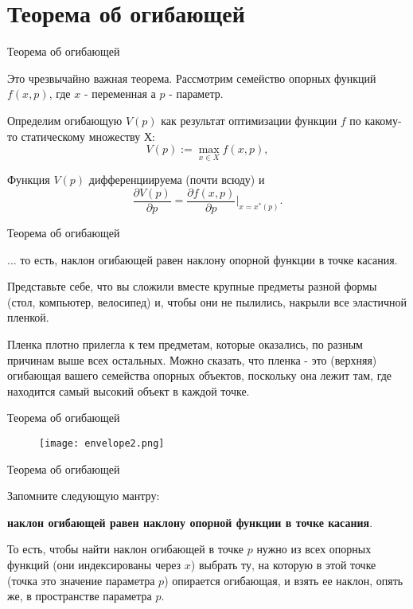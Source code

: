 \documentclass{beamer}
\begin{document}
\section{Теорема об огибающей}

\begin{frame}{Теорема об огибающей}

Это чрезвычайно важная теорема. Рассмотрим семейство опорных функций $f(x, p)$, где $x$ - переменная а $p$ - параметр. 

Определим огибающую $V(p)$ как результат оптимизации функции $f$ по какому-то статическому множеству $Х$: 
$$ V(p) := \max_{x \in X} f(x, p),$$

\begin{theorem}[Об огибающей]
Функция $V(p)$ дифференциируема (почти всюду) и 
$$\frac{\partial V(p)}{\partial p} = \frac{\partial f(x, p)}{\partial p}|_{x = x^{\ast}(p)}.$$
\end{theorem}

\end{frame}

\begin{frame}{Теорема об огибающей}

... то есть, наклон огибающей равен наклону опорной функции в точке касания.

Представьте себе, что вы сложили вместе крупные предметы разной формы (стол, компьютер, велосипед) и, чтобы они не пылились, накрыли все эластичной пленкой. 

Пленка плотно прилегла к тем предметам, которые оказались, по разным причинам выше всех остальных. Можно сказать, что пленка - это (верхняя) огибающая вашего семейства опорных объектов, поскольку она лежит там, где находится самый высокий объект в каждой точке.

\end{frame}

\begin{frame}{Теорема об огибающей}

\begin{figure}[hbt]
\centering
\texttt{[image: envelope2.png]}
\end{figure}

\end{frame}

\begin{frame}{Теорема об огибающей}

Запомните следующую мантру: 

\textbf{наклон огибающей равен наклону опорной функции в точке касания}. 

То есть, чтобы найти наклон огибающей в точке $p$ нужно из всех опорных функций (они индексированы через $x$) выбрать ту, на которую в этой точке (точка это значение параметра $p$) опирается огибающая, и взять ее наклон, опять же, в пространстве параметра $p$. 

\end{frame}
\end{document}
